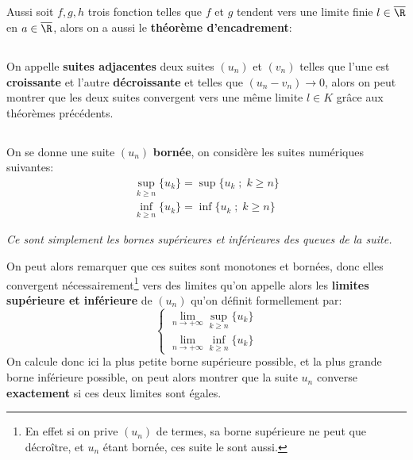 \subsection*{}
Aussi soit \(f, g, h\) trois fonction telles que \(f\) et \(g\) tendent vers une limite finie \(l \in \overline{\R}\) en \(a \in \overline{\R}\), alors on a aussi le \textbf{théorème d'encadrement}:
\subsection*{}
On appelle \textbf{suites adjacentes} deux suites \((u_n)\) et \((v_n)\) telles que l'une est \textbf{croissante} et l'autre \textbf{décroissante} et telles que \((u_n - v_n) \rightarrow 0\), alors on peut montrer que les deux suites convergent vers une même limite \(l \in K\) grâce aux théorèmes précédents.
\subsection*{}
On se donne une suite \((u_n)\) \textbf{bornée}, on considère les suites numériques suivantes:
\begin{align*}
   \sup_{k \geq n}\{ u_k \} = \sup\{ u_k \; ; \; k \geq n\}\\
   \inf_{k \geq n}\{ u_k \} = \inf\{ u_k \; ; \; k \geq n\}
\end{align*}
\begin{center}
    \textit{
      Ce sont simplement les bornes supérieures et inférieures des queues de la suite. 
    }
\end{center}
On peut alors remarquer que ces suites sont monotones et bornées, donc elles convergent nécessairement\footnote[1]{En effet si on prive \((u_n)\) de termes, sa borne supérieure ne peut que décroître, et \(u_n\) étant bornée, ces suite le sont aussi.} vers des limites qu'on appelle alors les \textbf{limites supérieure et inférieure} de \((u_n)\) qu'on définit formellement par:
\[
   \begin{cases}
      \lim_{n \rightarrow +\infty}\sup_{k \geq n}\{ u_k \}\\
      \lim_{n \rightarrow +\infty}\inf_{k \geq n}\{ u_k \}
   \end{cases}
\]
On calcule donc ici la plus petite borne supérieure possible, et la plus grande borne inférieure possible, on peut alors montrer que la suite \(u_n\) converse \textbf{exactement} si ces deux limites sont égales.
